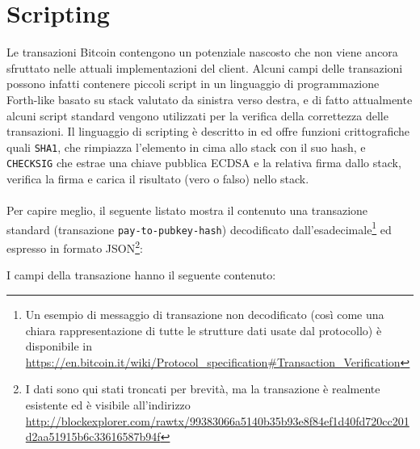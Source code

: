 \chapter{Scripting}\label{transaction-scripting}

Le transazioni Bitcoin contengono un potenziale nascosto che non viene ancora sfruttato nelle attuali implementazioni del client.
Alcuni campi delle transazioni possono infatti contenere piccoli script in un linguaggio di programmazione Forth-like basato su stack valutato da sinistra verso destra, e di fatto attualmente alcuni script standard vengono utilizzati per la verifica della correttezza delle transazioni. Il linguaggio di scripting è descritto in \cite{bitcoin-scripting-api} ed offre funzioni crittografiche quali \verb|SHA1|, che rimpiazza l'elemento in cima allo stack con il suo hash, e \verb|CHECKSIG| che estrae una chiave pubblica ECDSA e la relativa firma dallo stack, verifica la firma e carica il risultato (vero o falso) nello stack.\\\\
Per capire meglio, il seguente listato mostra il contenuto una transazione standard (transazione \verb|pay-to-pubkey-hash|) decodificato dall'esadecimale\footnote{Un esempio di messaggio di transazione non decodificato (così come una chiara rappresentazione di tutte le strutture dati usate dal protocollo) è disponibile in \url{https://en.bitcoin.it/wiki/Protocol_specification\#Transaction_Verification} } ed espresso in formato JSON\footnote{I dati sono qui stati troncati per brevità, ma la transazione è realmente esistente ed è visibile all'indirizzo \url{http://blockexplorer.com/rawtx/99383066a5140b35b93e8f84ef1d40fd720cc201d2aa51915b6c33616587b94f}}:



I campi della transazione hanno il seguente contenuto:

